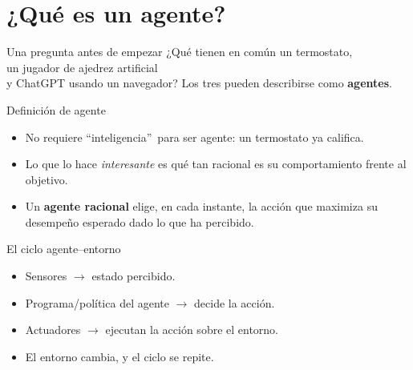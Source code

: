 \section{¿Qué es un agente?}

\begin{frame}{Una pregunta antes de empezar}
  \centering
  \Large
  ¿Qué tienen en común un termostato, \\
  un jugador de ajedrez artificial \\
  y ChatGPT usando un navegador?
  \vfill
  \normalsize
  \pause
  Los tres pueden describirse como \textbf{agentes}.
\end{frame}

\begin{frame}{Definición de agente}
  \vfill
  \begin{itemize}
    \item No requiere ``inteligencia''\, para ser agente: un termostato ya califica.
    \item Lo que lo hace \emph{interesante} es qué tan racional es su
      comportamiento frente al objetivo.
    \item Un \textbf{agente racional} elige, en cada instante, la acción que
      maximiza su desempeño esperado dado lo que ha percibido.
  \end{itemize}
\end{frame}

\begin{frame}{El ciclo agente–entorno}
  \centering

  \vfill
  \begin{itemize}
    \item Sensores $\to$ estado percibido.
    \item Programa/política del agente $\to$ decide la acción.
    \item Actuadores $\to$ ejecutan la acción sobre el entorno.
    \item El entorno cambia, y el ciclo se repite.
  \end{itemize}
\end{frame}

